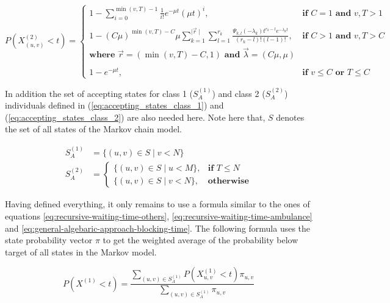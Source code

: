 \begin{equation}
    P(X_{(u,v)}^{(2)} < t) = 
    \begin{cases}
        1 - \sum_{i=0}^{\min(v,T)-1} \frac{1}{i!} e^{-\mu t} (\mu t)^i,  
            & \textbf{if } C = 1 \textbf{ and } v, T > 1 \\
        & \\
        1 - (C \mu ) ^ {\min(v,T) - C} \mu
            \sum_{k=1}^{\mid \vec{r} \mid} \sum_{l=1}^{r_k}
            \frac{\Psi_{k,l}(-\lambda_k)t^{r_k - l} 
            e^{-\lambda_k t}}{(r_k - l)! (l - 1)!}, 
            & \textbf{if } C > 1 \textbf{ and } v, T  > C \\
        \textbf{where } \vec{r}=(\min(v, T) - C, 1) \textbf{ and } 
            \vec{\lambda}=(C \mu, \mu) & \\
        & \\
        1 - e^{-\mu t}, & \textbf{if } v \leq C \textbf{ or } T \leq C
    \end{cases}
\end{equation}


In addition the set of accepting states for class 1 (\(S_A^{(1)}\)) and class 2 
(\(S_A^{(2)}\)) individuals defined in  (\ref{eq:accepting_states_class_1}) and 
(\ref{eq:accepting_states_class_2}) are also needed here.
Note here that, \(S\) denotes the set of all states of the Markov chain model. 

\begin{align*}
    S_A^{(1)} &= \{(u, v) \in S \; | \; v < N \} \\
    S_A^{(2)} &=
    \begin{cases}
        \{(u, v) \in S \; | \; u < M \}, & \textbf{if } T \leq N \\
        \{(u, v) \in S \; | \; v < N \}, & \textbf{otherwise}
    \end{cases}
\end{align*}

Having defined everything, it only remains to use a formula similar to the ones 
of equations \ref{eq:recursive-waiting-time-others}, 
\ref{eq:recursive-waiting-time-ambulance} and 
\ref{eq:general-algebaric-approach-blocking-time}.
The following formula uses the state probability vector \(\pi\) to get the 
weighted average of the probability below target of all states in the Markov
model.

\begin{equation}
    P(X^{(1)} < t) = \frac{\sum_{(u,v) \in S_A^{(1)}} P(X_{u,v}^{(1)} < t) 
    \pi_{u,v} }{\sum_{(u,v) \in S_A^{(1)}} \pi_{u,v}}
\end{equation}

